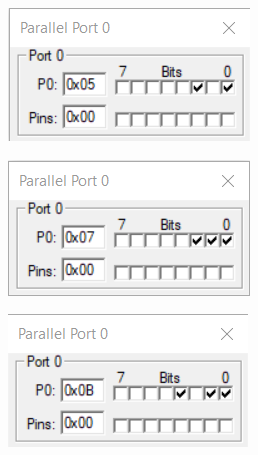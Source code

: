 \documentclass{lab_sheet}
\begin{document}
\begin{figure}[H]\ContinuedFloat
\begin{subfigure}{.5\textwidth}
  \centering
    \includegraphics[frame,width=.8\linewidth]{../Figures/1_7_c.png}  
  \label{fig:prob7-c}
  \caption{}
\end{subfigure}
\begin{subfigure}{.5\textwidth}
  \centering
  \includegraphics[frame,width=.8\linewidth]{../Figures/1_7_d.png}   
  \caption{}
  \label{fig:prob7-d}
\end{subfigure}
\begin{subfigure}{.5\textwidth}
  \centering
  \includegraphics[frame,width=.8\linewidth]{../Figures/1_7_e.png}  
  \label{fig:prob7-e}
  \caption{}
\end{subfigure}
\begin{subfigure}{.5\textwidth}

\end{subfigure}
\end{figure}
\end{document}
